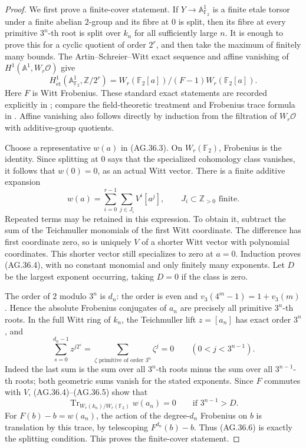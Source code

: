 \begin{proof}
We first prove a finite-cover statement. If \(Y\to
\mathbb A^1_{\mathbb F_2}\) is a finite etale torsor under a
finite abelian \(2\)-group and its fibre at \(0\) is split,
then its fibre at every primitive \(3^n\)-th root is split over
\(k_n\) for all sufficiently large \(n\).
It is enough to prove this for a cyclic quotient of order
\(2^r\), and then take the maximum of finitely many bounds.
The Artin--Schreier--Witt exact sequence and affine vanishing
of \(H^1(\mathbb A^1,W_r\mathcal O)\) give
\[
 H^1_{\mathrm{\acute et}}(\mathbb A^1_{\mathbb F_2},
                         \mathbb Z/2^r)
 =W_r(\mathbb F_2[a])/(F-1)W_r(\mathbb F_2[a]).
 \tag{AG.36.3}
\]
Here \(F\) is Witt Frobenius. These standard exact statements
are recorded explicitly in \citet[Theorem~1.2 and the following
cohomology sequence, p.~2]{AG_Sekiguchi2001}; compare the
field-theoretic treatment and Frobenius trace formula in
\citet[Theorem~3.2, Section~5.4, p.~29]{AG_KostersWan2016}.
Affine vanishing also follows directly by induction from the
filtration of \(W_r\mathcal O\) with additive-group quotients.

Choose a representative \(w(a)\) in (AG.36.3).
On \(W_r(\mathbb F_2)\), Frobenius is the identity. Since
splitting at \(0\) says that the specialized cohomology class
vanishes, it follows that \(w(0)=0\), as an actual Witt vector.
There is a finite additive expansion
\[
                 w(a)=\sum_{i=0}^{r-1}\sum_{j\in J_i}
                                  V^i[a^j],
                 \qquad J_i\subset\mathbb Z_{>0}\text{ finite}.
 \tag{AG.36.4}
\]
Repeated terms may be retained in this expression. To obtain
it, subtract the sum of the Teichmuller monomials of the first
Witt coordinate. The difference has first coordinate zero,
so is uniquely \(V\) of a shorter Witt vector with polynomial
coordinates. This shorter vector still specializes to zero
at \(a=0\). Induction proves (AG.36.4), with no constant
monomial and only finitely many exponents. Let \(D\) be the
largest exponent occurring, taking \(D=0\) if the class is
zero.

The order of \(2\) modulo \(3^n\) is \(d_n\): the order
is even and \(v_3(4^m-1)=1+v_3(m)\). Hence the absolute
Frobenius conjugates of \(a_n\) are precisely all primitive
\(3^n\)-th roots. In the full Witt ring of \(k_n\), the
Teichmuller lift \(z=[a_n]\) has exact order \(3^n\), and
\[
 \sum_{s=0}^{d_n-1}z^{j2^s}
 =\sum_{\zeta\text{ primitive of order }3^n}\zeta^j=0
 \qquad(0<j<3^{n-1}).
 \tag{AG.36.5}
\]
Indeed the last sum is the sum over all \(3^n\)-th roots
minus the sum over all \(3^{n-1}\)-th roots; both geometric
sums vanish for the stated exponents. Since \(F\) commutes
with \(V\), (AG.36.4)--(AG.36.5) show that
\[
 \operatorname{Tr}_{W_r(k_n)/W_r(\mathbb F_2)}w(a_n)=0
                       \qquad\text{if }3^{n-1}>D.
 \tag{AG.36.6}
\]
For \(F(b)-b=w(a_n)\), the action of the degree-\(d_n\)
Frobenius on \(b\) is translation by this trace, by telescoping
\(F^{d_n}(b)-b\). Thus (AG.36.6) is exactly the splitting
condition. This proves the finite-cover statement.


\end{proof}
